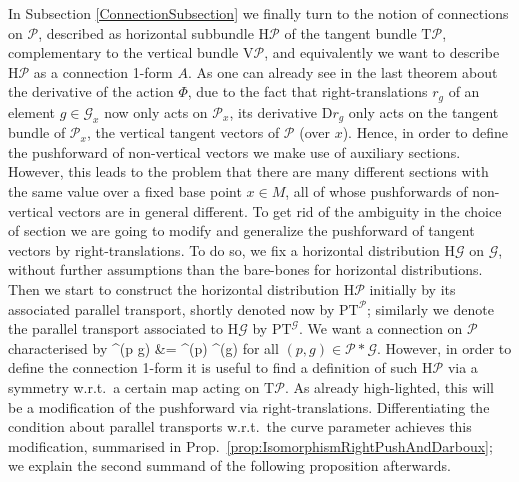 \documentclass[a4paper,oneside,11pt,bibliography=totoc]{scrartcl}
\def\bas#1\eas{\begin{align*}#1\end{align*}}
\theoremstyle{plain}
\theoremstyle{remark}
\theoremstyle{definition}
\begin{document}
In Subsection \ref{ConnectionSubsection} we finally turn to the notion of connections on $\mathcal{P}$, described as horizontal subbundle $\mathrm{H}\mathcal{P}$ of the tangent bundle $\mathrm{T}\mathcal{P}$, complementary to the vertical bundle $\mathrm{V}\mathcal{P}$, and equivalently we want to describe $\mathrm{H}\mathcal{P}$ as a connection 1-form $A$. As one can already see in the last theorem about the derivative of the action $\Phi$, due to the fact that right-translations $r_g$ of an element $g \in \mathcal{G}_x$ now only acts on $\mathcal{P}_x$, its derivative $\mathrm{D}r_g$ only acts on the tangent bundle of $\mathcal{P}_x$, the vertical tangent vectors of $\mathcal{P}$ (over $x$). Hence, in order to define the pushforward of non-vertical vectors we make use of auxiliary sections. However, this leads to the problem that there are many different sections with the same value over a fixed base point $x \in M$, all of whose pushforwards of non-vertical vectors are in general different. To get rid of the ambiguity in the choice of section we are going to modify and generalize the pushforward of tangent vectors by right-translations. To do so, we fix a horizontal distribution $\mathrm{H}\mathcal{G}$ on $\mathcal{G}$, without further assumptions than the bare-bones for horizontal distributions. Then we start to construct the horizontal distribution $\mathrm{H}\mathcal{P}$ initially by its associated parallel transport, shortly denoted now by $\mathrm{PT}^{\mathcal{P}}$; similarly we denote the parallel transport associated to $\mathrm{H}\mathcal{G}$ by $\mathrm{PT}^{\mathcal{G}}$. We want a connection on $\mathcal{P}$ characterised by
\bas
\mathrm{PT}^{}(p \cdot g)
&=
^{}(p) \cdot {}^{}(g)
\eas
for all $(p, g) \in \mathcal{P}*\mathcal{G}$. However, in order to define the connection 1-form it is useful to find a definition of such $\mathrm{H}\mathcal{P}$ via a symmetry w.r.t.\ a certain map acting on $\mathrm{T}\mathcal{P}$. As already high-lighted, this will be a modification of the pushforward via right-translations. Differentiating the condition about parallel transports w.r.t.\ the curve parameter achieves this modification, summarised in Prop.\ \ref{prop:IsomorphismRightPushAndDarboux}; we explain the second summand of the following proposition afterwards.
\end{document}

